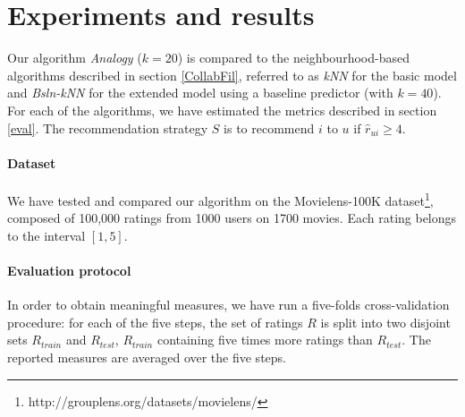 \documentclass{llncs}
\begin{document}
\section{Experiments and results}\label{results}

Our algorithm \textit{Analogy} ($k=20$) is compared to the neighbourhood-based algorithms
described in section \ref{CollabFil}, referred to as \textit{kNN} for the basic
model and \textit{Bsln-kNN} for the extended model using a baseline predictor
(with $k=40$). For each of the algorithms, we have estimated the metrics described
in section \ref{eval}. The recommendation strategy $S$ is to recommend $i$ to
$u$ if $\hat{r}_{ui} \geq 4$.

\paragraph{Dataset\\}
We have tested and compared our algorithm on the Movielens-100K
dataset\footnote{http://grouplens.org/datasets/movielens/}, composed of 100,000
ratings from 1000 users on 1700 movies. Each rating belongs to the interval
$[1, 5]$.

\paragraph{Evaluation protocol\\}
In order to obtain meaningful measures, we have run a five-folds
cross-validation procedure: for each of the five steps, the set of ratings $R$ is
split into two disjoint sets $R_{train}$ and $R_{test}$, $R_{train}$ containing
five times more ratings than $R_{test}$. The reported measures are averaged
over the five steps.

\end{document}
